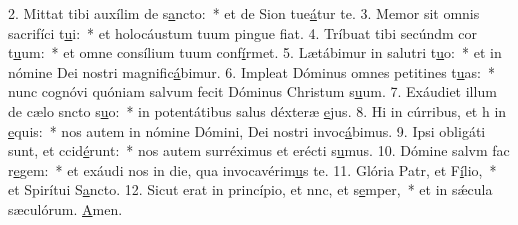 2. Mittat tibi auxílim de s\uline{a}ncto:~* et de Sion tue\uline{á}tur te.
3. Memor sit omnis sacrifíci t\uline{u}i:~* et holocáustum tuum pingue f\uline{i}at.
4. Tríbuat tibi secúndm cor t\uline{u}um:~* et omne consílium tuum conf\uline{í}rmet.
5. Lætábimur in salutri t\uline{u}o:~* et in nómine Dei nostri magnific\uline{á}bimur.
6. Impleat Dóminus omnes petitines t\uline{u}as:~* nunc cognóvi quóniam salvum fecit Dóminus Christum s\uline{u}um.
7. Exáudiet illum de cælo sncto s\uline{u}o:~* in potentátibus salus déxteræ \uline{e}jus.
8. Hi in cúrribus, et h in \uline{e}quis:~* nos autem in nómine Dómini, Dei nostri invoc\uline{á}bimus.
9. Ipsi obligáti sunt, et ccid\uline{é}runt:~* nos autem surréximus et erécti s\uline{u}mus.
10. Dómine salvm fac r\uline{e}gem:~* et exáudi nos in die, qua invocavérim\uline{u}s te.
11. Glória Patr, et F\uline{í}lio,~* et Spirítui S\uline{a}ncto.
12. Sicut erat in princípio, et nnc, et s\uline{e}mper,~* et in sǽcula sæculórum. \uline{A}men.
